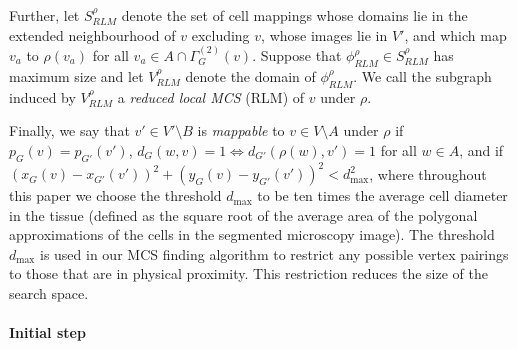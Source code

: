 \documentclass[a4paper,11pt]{article}
\begin{document}
Further, let $S_{RLM}^\rho$ denote the set of cell mappings whose domains lie in the extended neighbourhood of $v$ excluding $v$, whose images lie in $V'$, and which map $v_a$ to $\rho(v_a)$ for all $v_a \in A \cap \Gamma^{(2)}_G(v)$. 
Suppose that $\phi_{RLM}^\rho \in S_{RLM}^\rho$ has maximum size and let $V_{RLM}^\rho$ denote the domain of $\phi_{RLM}^\rho$. We call the subgraph induced by $V_{RLM}^\rho$ a \textit{reduced local MCS} (RLM) of $v$ under $\rho$.

Finally, we say that $v' \in V' \setminus B$ is \textit{mappable} to $v \in V \setminus A$ under $\rho$ if $p_{G}(v) = p_{G'}(v')$, $d_{G}(w,v) = 1 \Leftrightarrow d_{G'}(\rho(w), v') = 1$ for all $w \in A$, and if $(x_{G}(v) - x_{G'}(v'))^{2} + (y_{G}(v) - y_{G'}(v'))^{2} < d_\mathrm{max}^2$, where throughout this paper we choose the threshold $d_\mathrm{max}$ to be ten times the average cell diameter in the tissue
%
%
%
(defined as the square root of the average area of the polygonal approximations of the cells in the segmented microscopy image).
The threshold $d_\mathrm{max}$ is used in our MCS finding algorithm to restrict any possible vertex pairings to those that are in physical proximity.
This restriction reduces the size of the search space. 


\paragraph{Initial step}
\end{document}
